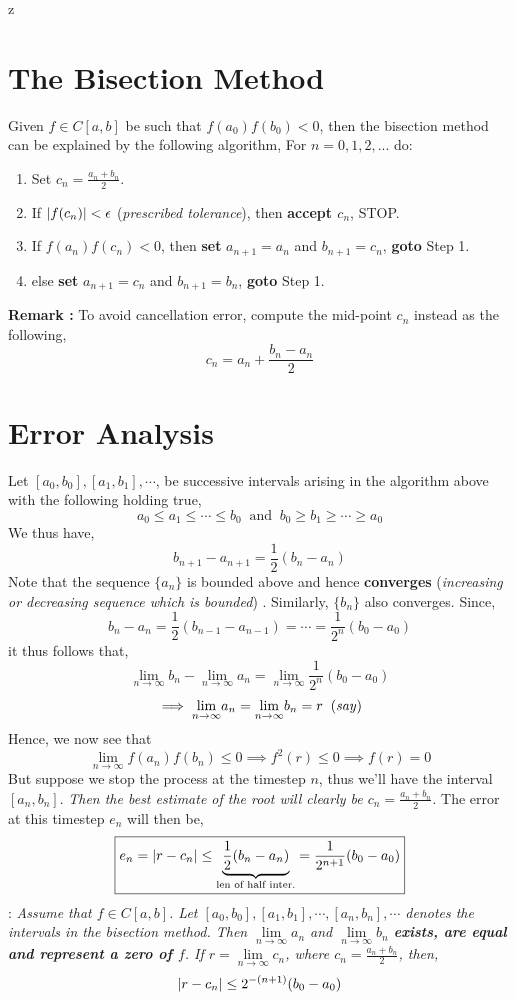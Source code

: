 z\documentclass[a4paper,12pt,twoside]{book}
\newcommand{\nll}[0]{\newline\newline}
\newcommand{\tit}[1]{\textit{#1}}
\newcommand{\theor}[1]{\boxed{\textbf{\textit{Theorem \thechapter.#1}}}}
\newcommand{\algo}[0]{\boxed{\textbf{\textit{Algorithm}}}}
\DeclarePairedDelimiter\abs{\lvert}{\rvert}
\begin{document}
\section{The Bisection Method}
Given $f\in C[a,b]$ be such that $f(a_0)f(b_0) < 0$, then the bisection method can be explained by the following algorithm,
\nll
\algo
\nll
For $n=0,1,2,...$ do:
\begin{enumerate}
    \item {Set $c_n = \frac{a_n + b_n}{2} $.}
    \item {If $\abs*{f(c_n)} < \epsilon$ (\tit{prescribed tolerance}), then \textbf{accept $c_n$}, STOP.}
    \item{If $f(a_n)f(c_n) < 0$, then \textbf{set} $a_{n+1} = a_n$ and $b_{n+1} = c_n$, \textbf{goto} Step 1.  }
    \item{else \textbf{set} $a_{n+1} = c_n$ and $b_{n+1} = b_n$, \textbf{goto} Step 1.}
\end{enumerate}

\textbf{Remark : }To avoid cancellation error, compute the mid-point $c_n$ instead as the following,
\[ c_n = a_n + \frac{b_n -a_n}{2} \]
\section{Error Analysis}
Let $[a_0, b_0], [a_1, b_1], \cdots$, be successive intervals arising in the algorithm above with the following holding true,
\[a_0\le a_1 \le \cdots \le b_0 \;\; \text{and} \;\; b_0\ge b_1\ge \cdots \ge a_0\]
We thus have,
\[b_{n+1} - a_{n+1} = \frac{1}{2} (b_n - a_n)\]
Note that the sequence $\{a_n\}$ is bounded above and hence \textbf{converges} (\tit{increasing or decreasing sequence which is bounded}) . Similarly, $\{b_n\}$ also converges.
\nll
Since,
\[ \boxed{b_n - a_n = \frac{1}{2}(b_{n-1} - a_{n-1})= \cdots = \frac{1}{2^n}(b_0 - a_0)}\]
it thus follows that,
\[ \underset{n\to\infty}{\lim} b_n - \underset{n\to\infty}{\lim} a_n = \underset{n\to\infty}{\lim} \frac{1}{2^n}(b_0 - a_0)\]
\[\implies \underset{n\to\infty}{\lim} a_n = \underset{n\to\infty}{\lim} b_n = r\;\;(\text{\tit{say}})\]
Hence, we now see that
\[ \boxed{\underset{n\to\infty}{\lim} f(a_n)f(b_n) \le 0 \implies f^2(r) \le 0 \implies f(r) = 0} \]
But suppose we stop the process at the timestep $n$, thus we'll have the interval $[a_n,b_n]$. \tit{Then the best estimate of the root will clearly be $c_n = \frac{a_n + b_n}{2}$.} The error at this timestep $e_n$ will then be,
\[ \boxed{e_n = \abs*{r - c_n} \le \underbrace{\frac{1}{2}(b_n - a_n)}_{\text{len of half inter.}} = \frac{1}{2^{n+1}}(b_0 - a_0) } \]
\theor{1}    : \tit{Assume that $f \in C[a,b]$. Let $[a_0,b_0], [a_1,b_1], \cdots, [a_n,b_n],\cdots$ denotes the intervals in the bisection method. Then $\underset{n\to\infty}{\lim} a_n$ and $\underset{n\to\infty}{\lim} b_n$ \textbf{exists, are equal and represent a zero of $f$}. If $r = \underset{n\to\infty}{\lim} c_n$, where $c_n = \frac{a_n + b_n}{2}$, then,
\[ \abs*{r - c_n} \le 2^{-(n+1)} (b_0 - a_0) \]
}
\end{document}
